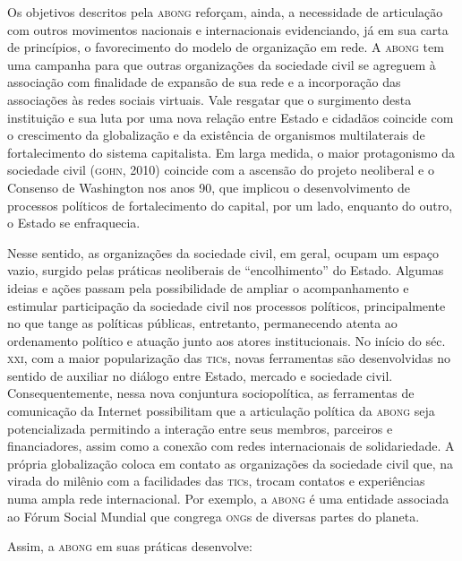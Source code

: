 Os objetivos descritos pela \textsc{abong} reforçam, ainda, a necessidade de
articulação com outros movimentos nacionais e internacionais
evidenciando, já em sua carta de princípios, o favorecimento do modelo
de organização em rede. A \textsc{abong} tem uma campanha para que outras
organizações da sociedade civil se agreguem à associação com finalidade
de expansão de sua rede e a incorporação das associações às redes
sociais virtuais. Vale resgatar que o surgimento desta instituição e sua
luta por uma nova relação entre Estado e cidadãos coincide com o
crescimento da globalização e da existência de organismos multilaterais
de fortalecimento do sistema capitalista. Em larga medida, o maior
protagonismo da sociedade civil (\textsc{gohn}, 2010) coincide com a ascensão
do projeto neoliberal e o Consenso de Washington nos anos 90, que
implicou o desenvolvimento de processos políticos de fortalecimento do
capital, por um lado, enquanto do outro, o Estado se enfraquecia.

Nesse sentido, as organizações da sociedade civil, em geral, ocupam um
espaço vazio, surgido pelas práticas neoliberais de ``encolhimento'' do
Estado. Algumas ideias e ações passam pela possibilidade de ampliar o
acompanhamento e estimular participação da sociedade civil nos processos
políticos, principalmente no que tange as políticas públicas,
entretanto, permanecendo atenta ao ordenamento político e atuação junto
aos atores institucionais. No início do séc. \textsc{xxi}, com a maior
popularização das \textsc{tic}s, novas ferramentas são desenvolvidas no sentido
de auxiliar no diálogo entre Estado, mercado e sociedade civil.
Consequentemente, nessa nova conjuntura sociopolítica, as ferramentas de
comunicação da Internet possibilitam que a articulação política da \textsc{abong}
seja potencializada permitindo a interação entre seus membros, parceiros
e financiadores, assim como a conexão com redes internacionais de
solidariedade. A própria globalização coloca em contato as organizações
da sociedade civil que, na virada do milênio com a facilidades das \textsc{tic}s,
trocam contatos e experiências numa ampla rede internacional. Por
exemplo, a \textsc{abong} é uma entidade associada ao Fórum Social Mundial que
congrega \textsc{ong}s de diversas partes do planeta.

Assim, a \textsc{abong} em suas práticas desenvolve:


